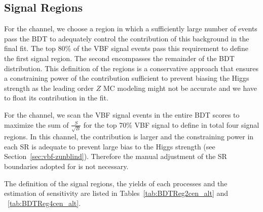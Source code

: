 \subsection{Signal Regions}
For the \twocentral channel, we choose a region in which
a sufficiently large number of \zjets{} events pass the BDT to
adequately control the contribution of this background in the final fit.
The top 80\% of the VBF signal events pass this requirement to define the first signal region.
The second encompasses the remainder of the BDT distribution. This definition of the regions
is a conservative approach that ensures a constraining power of the \zjets{} contribution
sufficient to prevent biasing the Higgs strength as the leading order $Z$ MC
modeling might not be accurate and we have to float its contribution in the fit.


For the \fourcentral channel, we scan the VBF signal events in the entire BDT scores to maximize the sum of $\frac{S}{\sqrt{B}}$ for the top 70\% VBF signal to define in total four signal regions. In this channel, the \zjets{} contribution is larger and the constraining power in each SR is adequate to prevent large bias to the Higgs strength (see Section~\ref{sec:vbf-zunblind}).
Therefore the manual adjustment of the SR boundaries adopted for \twocentral is not necessary.

The definition of the signal regions, the yields of each processes and the estimation of sensitivity are listed in Tables~\ref{tab:BDTReg2cen_alt} and ~\ref{tab:BDTReg4cen_alt}. 


